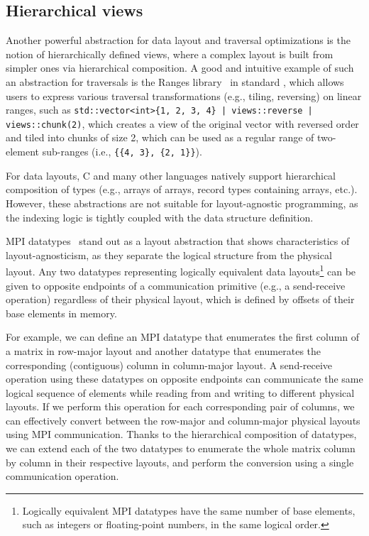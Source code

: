 \subsection{Hierarchical views}\label{sec:hierarchical-views}

Another powerful abstraction for data layout and traversal optimizations is the notion of hierarchically defined views, where a complex layout is built from simpler ones via hierarchical composition. A good and intuitive example of such an abstraction for traversals is the Ranges library~\cite{niebler2018one} in standard \cpp, which allows users to express various traversal transformations (e.g., tiling, reversing) on linear ranges, such as \lstinline/std::vector<int>{1, 2, 3, 4} | views::reverse | views::chunk(2)/, which creates a view of the original vector with reversed order and tiled into chunks of size 2, which can be used as a regular range of two-element sub-ranges (i.e., \lstinline/{{4, 3}, {2, 1}}/).

For data layouts, C and many other languages natively support hierarchical composition of types (e.g., arrays of arrays, record types containing arrays, etc.). However, these abstractions are not suitable for layout-agnostic programming, as the indexing logic is tightly coupled with the data structure definition.

MPI datatypes~\cite{mpi-5.0} stand out as a layout abstraction that shows characteristics of layout-agnosticism, as they separate the logical structure from the physical layout. Any two datatypes representing logically equivalent data layouts\footnote{Logically equivalent MPI datatypes have the same number of base elements, such as integers or floating-point numbers, in the same logical order.} can be given to opposite endpoints of a communication primitive (e.g., a send-receive operation) regardless of their physical layout, which is defined by offsets of their base elements in memory.

For example, we can define an MPI datatype that enumerates the first column of a matrix in row-major layout and another datatype that enumerates the corresponding (contiguous) column in column-major layout. A send-receive operation using these datatypes on opposite endpoints can communicate the same logical sequence of elements while reading from and writing to different physical layouts. If we perform this operation for each corresponding pair of columns, we can effectively convert between the row-major and column-major physical layouts using MPI communication. Thanks to the hierarchical composition of datatypes, we can extend each of the two datatypes to enumerate the whole matrix column by column in their respective layouts, and perform the conversion using a single communication operation.


